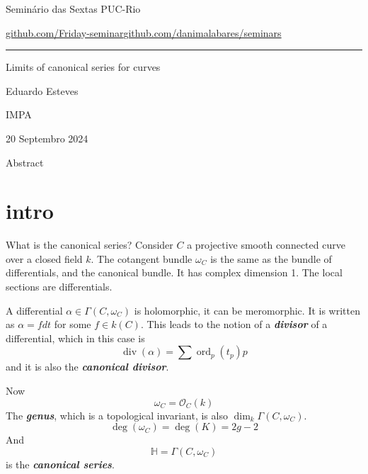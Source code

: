 


\begin{minipage}{\textwidth}
	\begin{minipage}{1\textwidth}
		Semin\'ario das Sextas \hfill PUC-Rio
		
		{\small\href{https://github.com/Friday-seminar/}{github.com/Friday-seminar}\hfill\href{https://github.com/danimalabares/seminars}{github.com/danimalabares/seminars}}
		\end{minipage}
\end{minipage}\vspace{.2cm}\hrule

\vspace{10pt}

Limits of canonical series for curves
{\Huge }

\hfill{\Large Eduardo Esteves}

\hfill{\Large IMPA}

\hfill{\large 20 Septembro 2024}

\begin{idea7}{Abstract}\leavevmode
	
\end{idea7}

\tableofcontents

\section{intro}

What is the canonical series? Consider $C$ a projective smooth connected curve over a closed field $k$. The cotangent bundle  $\omega_C$ is the same as the bundle of differentials, and the canonical bundle. It has complex dimension 1. The local sections are differentials.

A differential $\alpha \in\Gamma(C,\omega_C)$ is holomorphic, it can be meromorphic. It is written as $\alpha=fdt$ for some $f\in k(C)$. This leads to the notion of a \textit{\textbf{divisor}} of a differential, which in this case is
 \[\operatorname{div}(\alpha)=\sum \operatorname{ord}_p(t_p)p\]
 and it is also the \textit{\textbf{canonical divisor}}. 

 Now
 \[\omega_C=\mathcal{O}_C(k)\]
 The \textit{\textbf{genus}}, which is a topological invariant, is also  $\dim_k\Gamma(C,\omega_C)$.
 \[\operatorname{deg}(\omega_C)=\operatorname{deg}(K)=2g-2\]
 And
 \[\mathbb{H}=\Gamma(C,\omega_C)\]
 is the \textit{\textbf{canonical series}}.


